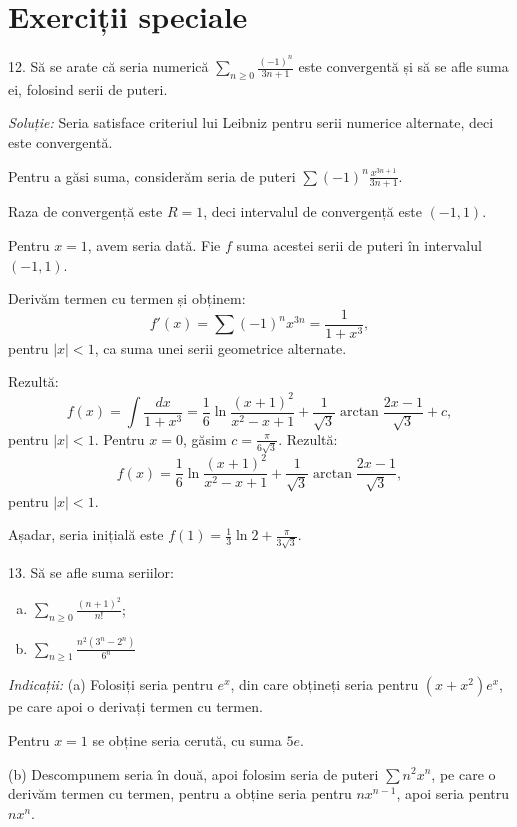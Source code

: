 \documentclass[11pt,a4paper]{article}
\newcommand\ds{\displaystyle}
\theoremstyle{dotless}
\theoremstyle{dotlessdr}
\begin{document}

\section{Exerciții speciale}
\label{sec:ex-sp}

12. Să se arate că seria numerică $\ds\sum_{n \geq 0} \frac{(-1)^n}{3n + 1}$ este
convergentă și să se afle suma ei, folosind serii de puteri.

\emph{Soluție:} Seria satisface criteriul lui Leibniz pentru serii numerice
alternate, deci este convergentă.

Pentru a găsi suma, considerăm seria de puteri $\sum (-1)^n \frac{x^{3n + 1}}{3n + 1}$.

Raza de convergență este $R = 1$, deci intervalul de convergență este $(-1, 1)$.

Pentru $x = 1$, avem seria dată. Fie $f$ suma acestei serii de puteri în
intervalul $(-1, 1)$.

Derivăm termen cu termen și obținem:
\[
  f'(x) = \sum (-1)^n x^{3n} = \frac{1}{1 + x^3},
\]
pentru $|x| < 1$, ca suma unei serii geometrice alternate.

Rezultă:
\[
  f(x) = \int \frac{dx}{1 + x^3} = \frac{1}{6} \ln \frac{(x + 1)^2}{x^2 - x + 1} + %
  \frac{1}{\sqrt{3}} \arctan \frac{2x - 1}{\sqrt{3}} + c,
\]
pentru $|x| < 1$. Pentru $x = 0$, găsim $c = \frac{\pi}{6 \sqrt{3}}$.
Rezultă:
\[
  f(x) = \frac{1}{6} \ln \frac{(x + 1)^2}{x^2 - x + 1} + %
  \frac{1}{\sqrt{3}} \arctan \frac{2x - 1}{\sqrt{3}},
\]
pentru $|x| < 1$.

Așadar, seria inițială este $f(1) = \frac{1}{3} \ln 2 + \frac{\pi}{3 \sqrt{3}}$.

\vspace{1cm}

13. Să se afle suma seriilor:
\begin{enumerate}[(a)]
\item $\ds\sum_{n \geq 0} \frac{(n + 1)^2}{n!}$;
\item $\ds\sum_{n \geq 1} \frac{n^2(3^n - 2^n)}{6^n}$
\end{enumerate}

\emph{Indicații:} (a) Folosiți seria pentru $e^x$, din care obțineți seria
pentru $(x + x^2)e^x$, pe care apoi o derivați termen cu termen.

Pentru $x = 1$ se obține seria cerută, cu suma $5e$.

(b) Descompunem seria în două, apoi folosim seria de puteri $\sum n^2 x^n$,
pe care o derivăm termen cu termen, pentru a obține seria pentru $nx^{n - 1}$,
apoi seria pentru $nx^n$.
\end{document}
